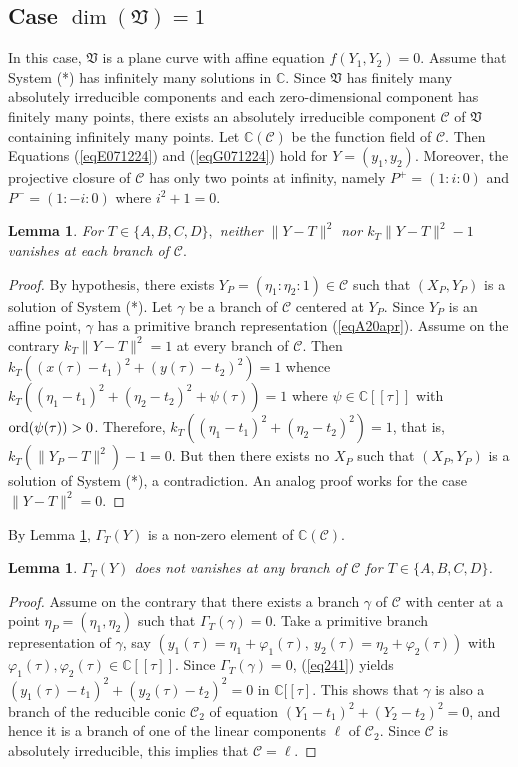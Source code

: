 \documentclass[10pt]{amsart}
\newtheorem{lem}[thm]{Lemma}
\theoremstyle{definition}
\theoremstyle{remark}
\def\cC{\mathcal C}
\begin{document}
\subsection{Case $\dim(\mathfrak{V})=1$}
In this case, $\mathfrak{V}$ is a plane curve with affine equation $f(Y_1,Y_2)=0$. Assume that System (*) has infinitely many solutions in $\mathbb{C}$. Since $\mathfrak{V}$ has finitely many absolutely irreducible components and each zero-dimensional component has finitely many points, there exists an absolutely irreducible component $\cC$ of $\mathfrak{V}$ containing infinitely many points. Let $\mathbb{C}(\cC)$ be the function field of $\cC$. Then Equations (\ref{eqE071224}) and (\ref{eqG071224}) hold for $Y=(y_1,y_2)$. Moreover, the projective closure of $\cC$ has only two points at infinity, namely $P^{+}=(1:i:0)$ and $P^{-}=(1:-i:0)$ where $i^2+1=0$.
\begin{lem}
\label{lem20apr} For $T\in\{A,B,C,D\},$ neither $\|Y-T\|^2$ nor $k_T\|Y-T\|^2-1$ vanishes at each branch of $\cC.$
\end{lem}
\begin{proof}  By hypothesis, there exists $Y_P=(\eta_1:\eta_2:1)\in \cC$ such that $(X_P,Y_P)$ is a solution of System (*). Let $\gamma$ be a branch of $\cC$ centered at $Y_P$. Since $Y_P$ is an affine point, $\gamma$ has a primitive branch representation (\ref{eqA20apr}).
Assume on the contrary $k_T\|Y-T\|^2=1$ at every branch of $\cC$. Then $k_T((x(\tau)-t_1)^2+(y(\tau)-t_2)^2)=1$ whence
$k_T((\eta_1-t_1)^2+(\eta_2-t_2)^2+\psi(\tau))=1$ where $\psi\in \mathbb{C}[[\tau]]$ with ${\rm{ord}}(\psi(\tau))>0$. Therefore, $k_T((\eta_1-t_1)^2+(\eta_2-t_2)^2)=1$, that is, $k_T(\|Y_P-T\|^2)-1=0$. But then there exists no $X_P$ such that $(X_P,Y_P)$ is a solution of System (*), a contradiction. An analog proof works for the case $\|Y-T\|^2=0$.
\end{proof}
By Lemma \ref{lem20apr}, $\Gamma_T(Y)$ is a non-zero element of $\mathbb{C}(\cC)$.
\begin{lem}
\label{lemE071224}$\Gamma_T(Y)$ does not vanishes at any branch of $\cC$ for $T\in\{A,B,C,D\}$.
\end{lem}
\begin{proof} Assume on the contrary that there exists a branch $\gamma$ of $\cC$ with center at a point $\eta_P=(\eta_1,\eta_2)$ such that $\Gamma_T(\gamma)=0$. Take a primitive branch representation of $\gamma$, say $(y_1(\tau)=\eta_1+\varphi_1(\tau),\ y_2(\tau)=\eta_2+\varphi_2(\tau))$ with $\varphi_1(\tau),\varphi_2(\tau)\in \mathbb{C}[[\tau]]$. Since $\Gamma_T(\gamma)=0$, (\ref{eq241}) yields $(y_1(\tau)-t_1)^2+(y_2(\tau)-t_2)^2=0$ in $\mathbb{C}[[\tau]$. This shows that $\gamma$ is also a branch of the reducible conic $\cC_2$ of equation $(Y_1-t_1)^2+(Y_2-t_2)^2=0$, and hence it is a branch of one of the linear components $\ell$ of $\cC_2$. Since $\cC$ is absolutely irreducible, this implies that $\cC=\ell$.
\end{proof}
\end{document}
